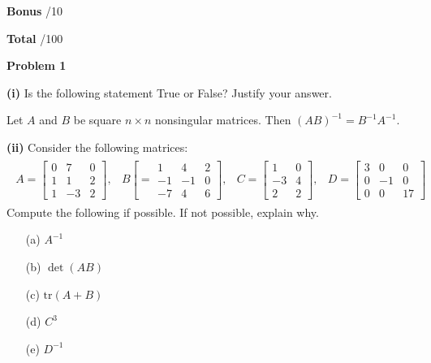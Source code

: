 \documentclass[12pt]{amsbook}
\begin{document}
\vspace{.25cm}

\textbf{Bonus} \;\hspace{.9cm} \underline{\hspace{.75cm}}/10

\vspace{.25cm}

\textbf{Total} \;\hspace{1.1cm} \underline{\hspace{.75cm}}/100










\newpage

\textbf{Problem 1}

\vspace{.25cm}

\textbf{(i)} Is the following statement True or False? Justify your answer.
\begin{center}
Let $A$ and $B$ be square $n\times n$ nonsingular matrices. Then $(AB)^{-1} = B^{-1}A^{-1}$.
\end{center}

\vspace{4cm}

\textbf{(ii)} Consider the following matrices:
\begin{align*}
\begin{array}{llll}
A=\left[\begin{array}{ccc}
0 & 7 & 0 \\ 1 & 1 & 2 \\ 1 & -3 & 2
\end{array}\right], & B\left[=\begin{array}{ccc}
1 & 4 & 2 \\ -1 & -1 & 0 \\ -7 & 4 & 6
\end{array}\right], & C=\left[\begin{array}{cc}
1 & 0 \\ -3 & 4 \\ 2 & 2
\end{array}\right], & D=\left[\begin{array}{ccc}
3 & 0 & 0 \\ 0 & -1 & 0 \\ 0 & 0 & 17
\end{array}\right]
\end{array}
\end{align*}
Compute the following if possible. If not possible, explain why.
\begin{itemize}
\item[(a)] $A^{-1}$
\item[(b)] $\det(AB)$
\item[(c)] $\text{tr}(A+B)$
\item[(d)] $C^3$
\item[(e)] $D^{-1}$
\end{itemize}
\end{document}
